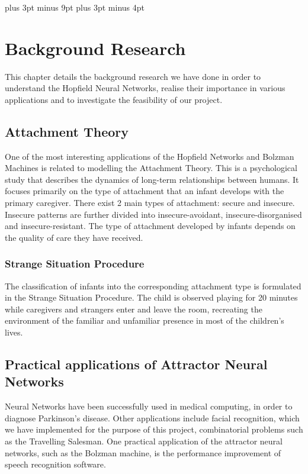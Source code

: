 \belowdisplayskip=12pt plus 3pt minus 9pt
\belowdisplayshortskip=7pt plus 3pt minus 4pt

\chapter{Background Research}
This chapter details the background research we have done in order to understand the Hopfield Neural Networks, realise their importance in various applications and to investigate the feasibility of our project. 

\section{Attachment Theory}

One of the most interesting applications of the Hopfield Networks and Bolzman Machines is related to modelling the Attachment Theory. This is a psychological study that describes the dynamics of long-term relationships between humans\cite{website:attachment_theory_wiki}. It focuses primarily on the type of attachment that an infant develops with the primary caregiver. There exist 2 main types of attachment: secure and insecure. Insecure patterns are further divided into insecure-avoidant, insecure-disorganised and insecure-resistant. The type of attachment developed by infants depends on the quality of care they have received\cite{website:attachment_theory_wiki}.

\subsection{Strange Situation Procedure}

The classification of infants into the corresponding attachment type is formulated in the Strange Situation Procedure. The child is observed playing for 20 minutes while caregivers and strangers enter and leave the room, recreating the environment of the familiar and unfamiliar presence in most of the children's lives.\cite{website:attachment_patterns_wiki}

\section{Practical applications of Attractor Neural Networks}

Neural Networks have been successfully used in medical computing, in order to diagnose Parkinson's disease\cite{nets_parkinsons}. Other applications include facial recognition, which we have implemented for the purpose of this project, combinatorial problems such as the Travelling Salesman\cite{hopfield_laferriere}. 
One practical application of the attractor neural networks, such as the Bolzman machine, is the performance improvement of speech recognition software\cite{speech_nets}.

